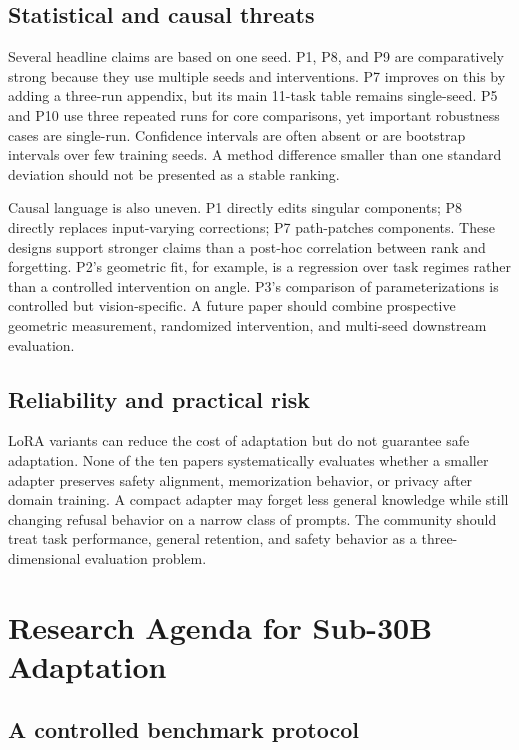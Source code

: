 \documentclass[11pt]{article}
\begin{document}
\subsection{Statistical and causal threats}

Several headline claims are based on one seed. P1, P8, and P9 are comparatively strong because they use multiple seeds and interventions. P7 improves on this by adding a three-run appendix, but its main 11-task table remains single-seed. P5 and P10 use three repeated runs for core comparisons, yet important robustness cases are single-run. Confidence intervals are often absent or are bootstrap intervals over few training seeds. A method difference smaller than one standard deviation should not be presented as a stable ranking.

Causal language is also uneven. P1 directly edits singular components; P8 directly replaces input-varying corrections; P7 path-patches components. These designs support stronger claims than a post-hoc correlation between rank and forgetting. P2's geometric fit, for example, is a regression over task regimes rather than a controlled intervention on angle. P3's comparison of parameterizations is controlled but vision-specific. A future paper should combine prospective geometric measurement, randomized intervention, and multi-seed downstream evaluation.

\subsection{Reliability and practical risk}

LoRA variants can reduce the cost of adaptation but do not guarantee safe adaptation. None of the ten papers systematically evaluates whether a smaller adapter preserves safety alignment, memorization behavior, or privacy after domain training. A compact adapter may forget less general knowledge while still changing refusal behavior on a narrow class of prompts. The community should treat task performance, general retention, and safety behavior as a three-dimensional evaluation problem.

\section{Research Agenda for Sub-30B Adaptation}

\subsection{A controlled benchmark protocol}
\end{document}
